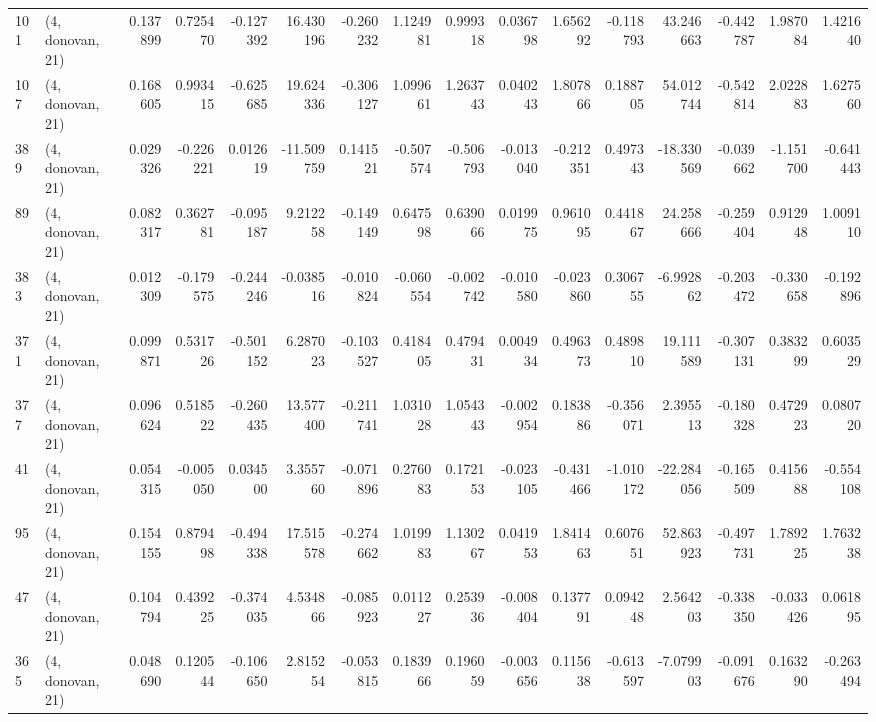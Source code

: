 \begin{tabular}{llrrrrrrrrrrrrrr}
101 &  (4, donovan, 21) &   0.137899 &  0.725470 & -0.127392 &   16.430196 & -0.260232 &   1.124981 &  0.999318 &  0.036798 &  1.656292 & -0.118793 &   43.246663 & -0.442787 &  1.987084 &  1.421640 \\
107 &  (4, donovan, 21) &   0.168605 &  0.993415 & -0.625685 &   19.624336 & -0.306127 &   1.099661 &  1.263743 &  0.040243 &  1.807866 &  0.188705 &   54.012744 & -0.542814 &  2.022883 &  1.627560 \\
389 &  (4, donovan, 21) &   0.029326 & -0.226221 &  0.012619 &  -11.509759 &  0.141521 &  -0.507574 & -0.506793 & -0.013040 & -0.212351 &  0.497343 &  -18.330569 & -0.039662 & -1.151700 & -0.641443 \\
89  &  (4, donovan, 21) &   0.082317 &  0.362781 & -0.095187 &    9.212258 & -0.149149 &   0.647598 &  0.639066 &  0.019975 &  0.961095 &  0.441867 &   24.258666 & -0.259404 &  0.912948 &  1.009110 \\
383 &  (4, donovan, 21) &   0.012309 & -0.179575 & -0.244246 &   -0.038516 & -0.010824 &  -0.060554 & -0.002742 & -0.010580 & -0.023860 &  0.306755 &   -6.992862 & -0.203472 & -0.330658 & -0.192896 \\
371 &  (4, donovan, 21) &   0.099871 &  0.531726 & -0.501152 &    6.287023 & -0.103527 &   0.418405 &  0.479431 &  0.004934 &  0.496373 &  0.489810 &   19.111589 & -0.307131 &  0.383299 &  0.603529 \\
377 &  (4, donovan, 21) &   0.096624 &  0.518522 & -0.260435 &   13.577400 & -0.211741 &   1.031028 &  1.054343 & -0.002954 &  0.183886 & -0.356071 &    2.395513 & -0.180328 &  0.472923 &  0.080720 \\
41  &  (4, donovan, 21) &   0.054315 & -0.005050 &  0.034500 &    3.355760 & -0.071896 &   0.276083 &  0.172153 & -0.023105 & -0.431466 & -1.010172 &  -22.284056 & -0.165509 &  0.415688 & -0.554108 \\
95  &  (4, donovan, 21) &   0.154155 &  0.879498 & -0.494338 &   17.515578 & -0.274662 &   1.019983 &  1.130267 &  0.041953 &  1.841463 &  0.607651 &   52.863923 & -0.497731 &  1.789225 &  1.763238 \\
47  &  (4, donovan, 21) &   0.104794 &  0.439225 & -0.374035 &    4.534866 & -0.085923 &   0.011227 &  0.253936 & -0.008404 &  0.137791 &  0.094248 &    2.564203 & -0.338350 & -0.033426 &  0.061895 \\
365 &  (4, donovan, 21) &   0.048690 &  0.120544 & -0.106650 &    2.815254 & -0.053815 &   0.183966 &  0.196059 & -0.003656 &  0.115638 & -0.613597 &   -7.079903 & -0.091676 &  0.163290 & -0.263494 \\

\end{tabular}
